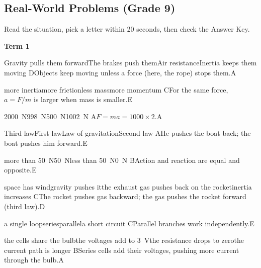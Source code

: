 \subsection{Real-World Problems (Grade 9)}
{\small Read the situation, pick a letter within 20 seconds, then check the Answer Key.\par}
\begin{gradebody}

\textbf{Term 1}

{Gravity pulls them forward}{The brakes push them}{Air resistance}{Inertia keeps them moving}
{D}{Objects keep moving unless a force (here, the rope) stops them.}{A}

{more inertia}{more friction}{less mass}{more momentum}
{C}{For the same force, $a = F/m$ is larger when mass is smaller.}{E}

{\SI{2000}{N}}{\SI{998}{N}}{\SI{500}{N}}{\SI{1002}{N}}
{A}{$F = ma = 1000 \times 2$.}{A}

{Third law}{First law}{Law of gravitation}{Second law}
{A}{He pushes the boat back; the boat pushes him forward.}{E}

{more than \SI{50}{N}}{\SI{50}{N}}{less than \SI{50}{N}}{\SI{0}{N}}
{B}{Action and reaction are equal and opposite.}{E}

{space has wind}{gravity pushes it}{the exhaust gas pushes back on the rocket}{inertia increases}
{C}{The rocket pushes gas backward; the gas pushes the rocket forward (third law).}{D}

{a single loop}{series}{parallel}{a short circuit}
{C}{Parallel branches work independently.}{E}

{the cells share the bulb}{the voltages add to \SI{3}{V}}{the resistance drops to zero}{the current path is longer}
{B}{Series cells add their voltages, pushing more current through the bulb.}{A}


\end{gradebody}
